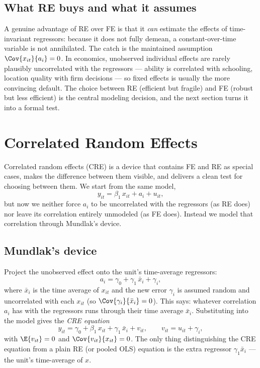 
\subsection{What RE buys and what it assumes}

A genuine advantage of RE over FE is that it \emph{can} estimate the effects of time-invariant regressors: because it does not fully demean, a constant-over-time variable is not annihilated. The catch is the maintained assumption $\Cov{x_{it}}{a_i}=0$. In economics, unobserved individual effects are rarely plausibly uncorrelated with the regressors --- ability is correlated with schooling, location quality with firm decisions --- so fixed effects is usually the more convincing default. The choice between RE (efficient but fragile) and FE (robust but less efficient) is the central modeling decision, and the next section turns it into a formal test.

\section{Correlated Random Effects}
\label{sec:cre}

Correlated random effects (CRE) is a device that contains FE and RE as special cases, makes the difference between them visible, and delivers a clean test for choosing between them. We start from the same model,
\[
y_{it} = \beta_1\, x_{it} + a_i + u_{it},
\]
but now we neither force $a_i$ to be uncorrelated with the regressors (as RE does) nor leave its correlation entirely unmodeled (as FE does). Instead we model that correlation through Mundlak's device.

\subsection{Mundlak's device}

Project the unobserved effect onto the unit's time-average regressors:
\[
a_i = \gamma_0 + \gamma_1\,\bar x_i + \gamma_i,
\]
where $\bar x_i$ is the time average of $x_{it}$ and the new error $\gamma_i$ is assumed random and uncorrelated with each $x_{it}$ (so $\Cov{\gamma_i}{\bar x_i}=0$). This says: whatever correlation $a_i$ has with the regressors runs through their time average $\bar x_i$. Substituting into the model gives the \emph{CRE equation}
\[
y_{it} = \gamma_0 + \beta_1\, x_{it} + \gamma_1\,\bar x_i + v_{it},
\qquad v_{it} = u_{it} + \gamma_i,
\]
with $\E{v_{it}}=0$ and $\Cov{v_{it}}{x_{it}}=0$. The only thing distinguishing the CRE equation from a plain RE (or pooled OLS) equation is the extra regressor $\gamma_1\bar x_i$ --- the unit's time-average of $x$.

